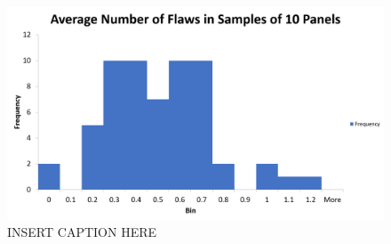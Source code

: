 \documentclass[letterpaper]{article}
\begin{document}
\subsection{}%

\subsection{}%

\subsection{}%

\begin{figure}[H]
 \centering
 \includegraphics[width=\textwidth]{q4.png}
 \caption{INSERT CAPTION HERE}
 \label{4c}
\end{figure}

\subsection{}%

\section{}%

\subsection{}%
\end{document}
